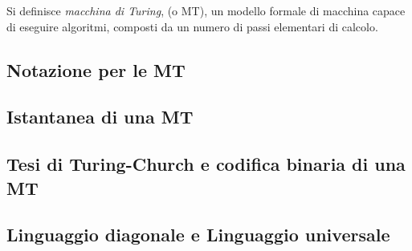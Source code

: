 \documentclass{subfiles}
\begin{document}
\label{sec:8}
\begin{Definition*}
    Si definisce \emph{macchina di Turing}, (o MT), un modello formale di macchina capace di eseguire algoritmi,
    composti da un numero di passi elementari di calcolo.
\end{Definition*}

\subsection{Notazione per le MT}


\subsection{Istantanea di una MT}


\subsection{Tesi di Turing-Church e codifica binaria di una MT}


\subsection{Linguaggio diagonale e Linguaggio universale}

\end{document}
